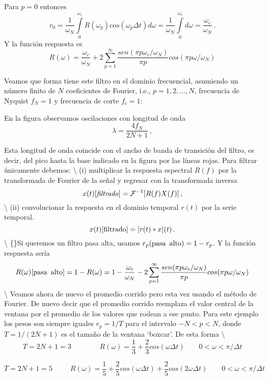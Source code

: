 \documentclass[
]{agujournal2019}
\begin{document}
Para \(p=0\) entonces
\[r_0=\frac{1}{\omega_N}\int\limits^{\omega_c}_0 R(\omega_p) cos(\omega_p \Delta t
)d{\omega}=\frac{1}{\omega_N}\int\limits^{\omega_c}_0 d{\omega}=\frac{\omega_c}{\omega_N}\,.\]
Y la función respuesta es
\[R(\omega)=\frac{\omega_c}{\omega_N} + 2\sum\limits^{\infty}_{p=1}
\frac{sen(\pi p \omega_c / \omega_N)}{\pi p}cos(\pi p \omega / \omega_N)\]

Veamos que forma tiene este filtro en el dominio frecuencial, asumiendo
un número finito de \(N\) coeficientes de Fourier, i.e.,
\(p=1,2,...,N\), frecuencia de Nyquist \(f_N=1\) y frecuencia de corte
\(f_c=1\):

\begin{center}
\end{center}

En la figura observamos oscilaciones con longitud de onda
\[\lambda=\frac{4f_N}{2N+1}\,,\]

Esta longitud de onda coincide con el ancho de banda de transición del
filtro, es decir, del pico hasta la base indicado en la figura por las
líneas rojas. Para filtrar únicamente debemos: \textbackslash{} (i)
multiplicar la respuesta espectral \(R(f)\) por la transformada de
Fourier de la señal y regresar con la transformada inversa
\[x(t)[{\it filtrado}]={\cal F}^{-1}[R(f)X(f)]\,,\] \textbackslash{}
(ii) convolucionar la respuesta en el dominio temporal \(r(t)\) por la
serie temporal. \[x(t)[{\rm filtrado}]=[r(t)*x](t)\,.\] \textbackslash{}
\{\noindent\}Si queremos un filtro pasa alta, usamos
\(r_p({\rm pasa}\,\,\,{\rm alto})=1-r_p\). Y la función respuesta sería
\[R(\omega)[{\rm pasa}\,\,\,{\rm alto}]=1-R(\omega)=1-\frac{\omega_c}{\omega_N} - 2\sum\limits^{\infty}_{p=1}
\frac{sen(\pi p \omega_c / \omega_N)}{\pi p}cos(\pi p \omega / \omega_N)\]
\textbackslash{} Veamos ahora de nuevo el promedio corrido pero esta vez
usando el método de Fourier. De nuevo decir que el promedio corrido
reemplaza el valor central de la ventana por el promedio de los valores
que rodean a ese punto. Para este ejemplo los pesos son siempre iguales
\(r_p=1/T\) para el intervalo \(-N<p<N\), donde \(T=1/(2N+1)\) es el
tamaño de la ventana `boxcar'. De esta forma \textbackslash{}
\[T=2N+1=3\,\,\,\,\,\,\,\,\,\,\,\,\,\,\,\,\,\,\,\,\,\,\,\,
R(\omega)=\frac{1}{3} + \frac{2}{3}cos(\omega \Delta t)
\,\,\,\,\,\,\,\,\,\,\,\,0<\omega<\pi/\Delta t\]

\[T=2N+1=5\,\,\,\,\,\,\,\,\,\,\,\,\,\,\,
R(\omega)=\frac{1}{5} + \frac{2}{5}cos(\omega \Delta t)+ \frac{2}{5}cos(2\omega \Delta t)
\,\,\,\,\,\,\,\,\,\,\,\,0<\omega<\pi/\Delta t\]
\end{document}
